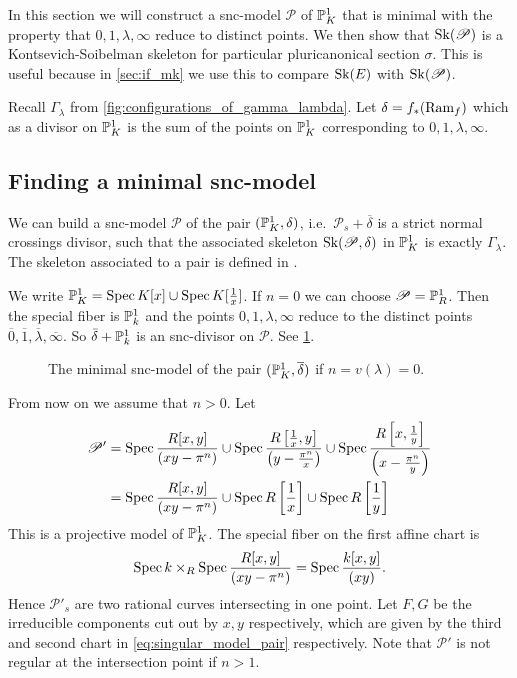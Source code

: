 In this section we will construct a snc-model $\mathscr P$ of $\mathbb{P}^{1}_K$ that is minimal with the property that $0, 1, \lambda, \infty$ reduce to distinct points. 
We then show that $\operatorname{Sk}(\mathscr P)$ is a Kontsevich-Soibelman skeleton for particular pluricanonical section $\sigma$.
This is useful because in \cref{sec:if_mk} we use this to compare  $\operatorname{Sk}(E)$ with $\operatorname{Sk}(\mathscr P)$. 

Recall $\Gamma_\lambda$ from \cref{fig:configurations_of_gamma_lambda}. 
Let $\delta = f_* (\operatorname{Ram}_f)$ which as a divisor on $\mathbb{P}^{1}_K$ is the sum of the points on $\mathbb{P}^{1}_K$ corresponding to $0, 1, \lambda, \infty$. 

\subsection{Finding a minimal snc-model} \label{sec:finding_a_minimal_snc_model}
We can build a snc-model $\mathscr P$ of the pair $(\mathbb{P}^{1}_K, \delta)$, i.e.\ $\mathscr P_s + \overline{\delta}$ is a strict normal crossings divisor, such that the associated skeleton $\operatorname{Sk}(\mathscr P, \delta)$ in $\mathbb{P}^{1}_K$ is exactly $\Gamma_\lambda$. 
The skeleton associated to a pair is defined in \cite[§3.2.1]{bakerWeightFunctionsBerkovich2016}.

We write $\mathbb{P}^{1}_K = \operatorname{Spec} K[x] \cup \operatorname{Spec} K[\frac{1}{x}]$.
If $n = 0$ we can choose $\mathscr P = \mathbb{P}^{1}_R$. Then the special fiber is $\mathbb{P}^{1}_k$ and the points $0, 1, \lambda, \infty$ reduce to the distinct points $\overline{0}, \overline{1}, \overline{\lambda}, \overline{\infty}$.
So $\bar{\delta} + \mathbb{P}^{1}_k$ is an snc-divisor on $\mathscr P$. 
See \cref{fig:model_pair_n_1}. 
\begin{figure}[h]
    \centering
    \caption{The minimal snc-model of the pair $(\mathbb{P}^{1}_K, \overline{\delta})$ if $n =v(\lambda) = 0$.}
    \label{fig:model_pair_n_1}
\end{figure}

From now on we assume that $n > 0$. Let 
\begin{align}\label{eq:singular_model_pair}
	\mathscr P' &= \operatorname{Spec} \frac{R[x, y]}{(xy - \pi^{n})} \cup \operatorname{Spec} \frac{R\left[ \frac{1}{x},y \right]}{\left(y-\frac{\pi^{n}}{x}\right)} \cup \operatorname{Spec} \frac{R\left[x, \frac{1}{y}\right]}{\left(x - \frac{\pi^{n}}{y}\right)} \\
	&=  \operatorname{Spec} \frac{R[x, y]}{(xy - \pi^{n})} \cup \operatorname{Spec} R\left[ \frac{1}{x} \right] \cup \operatorname{Spec} R\left[ \frac{1}{y}\right] \nonumber 
 \end{align} 
This is a projective model of $\mathbb{P}^{1}_K$. 
The special fiber on the first affine chart is \[
	\operatorname{Spec} k \times _{R} \operatorname{Spec} \frac{R[x, y]}{(xy -\pi^{n})}=\operatorname{Spec}  \frac{k[x, y]}{(xy)}
.\] 
Hence $\mathscr P'_s$ are two rational curves intersecting in one point. 
Let $F, G$ be the irreducible components cut out by $x, y$ respectively, which are given by the third and second chart in \eqref{eq:singular_model_pair} respectively. 
Note that $\mathscr P'$ is not regular at the intersection point if $n > 1$.

